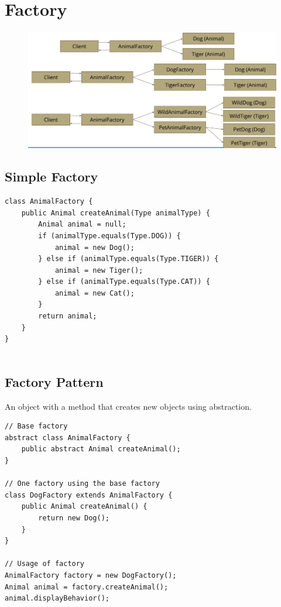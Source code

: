 \section{Factory}
\begin{figure}[H]
    \centering
    \includegraphics[width=\linewidth]{chapters/design_patterns/figures/factory_pattern_base.png}
\end{figure}
\clearpage
\subsection{Simple Factory}
\begin{lstlisting}
class AnimalFactory {
    public Animal createAnimal(Type animalType) {
        Animal animal = null;
        if (animalType.equals(Type.DOG)) {
            animal = new Dog();
        } else if (animalType.equals(Type.TIGER)) {
            animal = new Tiger();
        } else if (animalType.equals(Type.CAT)) {
            animal = new Cat();
        }
        return animal;
    }
}
         
\end{lstlisting}

\clearpage
\subsection{Factory Pattern}
An object with a method that creates new objects using abstraction.
\begin{lstlisting}
// Base factory
abstract class AnimalFactory {
    public abstract Animal createAnimal();
}

// One factory using the base factory
class DogFactory extends AnimalFactory {
    public Animal createAnimal() {
        return new Dog();
    }
}

// Usage of factory
AnimalFactory factory = new DogFactory();
Animal animal = factory.createAnimal();
animal.displayBehavior();
\end{lstlisting}

